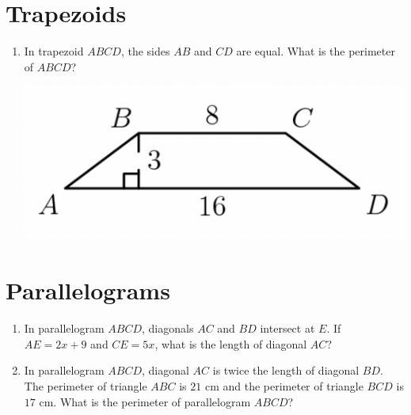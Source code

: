 \documentclass{article}
\begin{document}
\section*{Trapezoids}
\begin{enumerate}[resume]
    \item In trapezoid $ABCD$, the sides $AB$ and $CD$ are equal. 
        What is the perimeter of $ABCD$?
        \begin{center}
            \includegraphics[scale=0.4]{trapezoid1.png}
        \end{center}
        \vspace{3cm}
\end{enumerate}

\section*{Parallelograms}
\begin{enumerate}[resume]
    \item In parallelogram $ABCD$, diagonals $AC$ and $BD$ intersect at $E$.
        If $AE = 2x + 9$ and $CE = 5x$, what is the length of diagonal $AC$?
        \vspace{3cm}
    \item In parallelogram $ABCD$, diagonal $AC$ is twice the length of diagonal $BD$.
        The perimeter of triangle $ABC$ is $21$ cm and the perimeter of triangle $BCD$ is $17$ cm.
        What is the perimeter of parallelogram $ABCD$?
        \vspace{3cm}
\end{enumerate}
\end{document}
